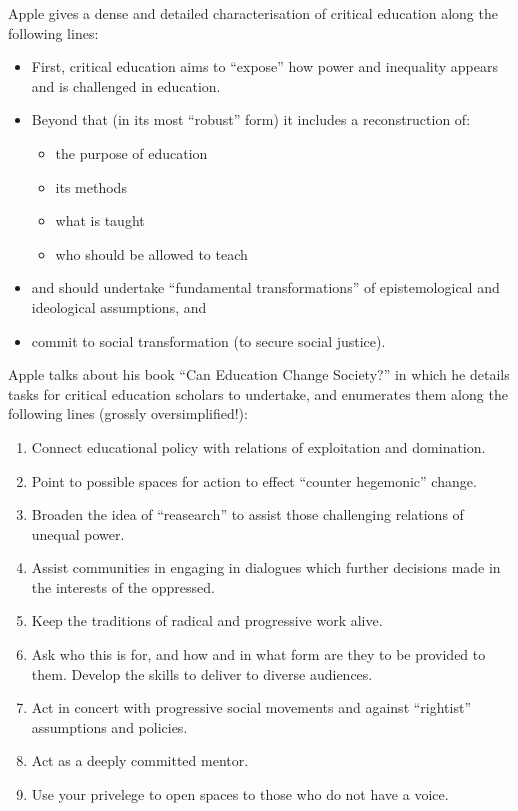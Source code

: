 \documentclass[10pt,titlepage]{book}
\begin{document}
Apple gives a dense and detailed characterisation of critical education along the following lines:

\begin{itemize}
\item First, critical education aims to ``expose'' how power and inequality appears and is challenged in education.
\item Beyond that (in its most ``robust'' form) it includes a reconstruction of:
  \begin{itemize}
  \item the purpose of education
  \item its methods
  \item what is taught
  \item who should be allowed to teach
  \end{itemize}
\item and should undertake ``fundamental transformations'' of epistemological and ideological assumptions, and
  \item commit to social transformation (to secure social justice).
\end{itemize}

Apple talks about his book ``Can Education Change Society?'' in which he details tasks for critical education scholars to undertake, and enumerates them along the following lines (grossly oversimplified!):

\begin{enumerate}

\item Connect educational policy with relations of exploitation and domination.
  
\item Point to possible spaces for action to effect ``counter hegemonic'' change.
  
\item Broaden the idea of ``reasearch'' to assist those challenging relations of unequal power.
  
\item Assist communities in engaging in dialogues which further decisions made in the interests of the oppressed.
  
\item Keep the traditions of radical and progressive work alive.
  
\item Ask who this is for, and how and in what form are they to be provided to them.  Develop the skills to deliver to diverse audiences.
  
\item Act in concert with progressive social movements and against ``rightist'' assumptions and policies.
  
\item Act as a deeply committed mentor.

\item Use your privelege to open spaces to those who do not have a voice.
  
\end{enumerate}
\end{document}
